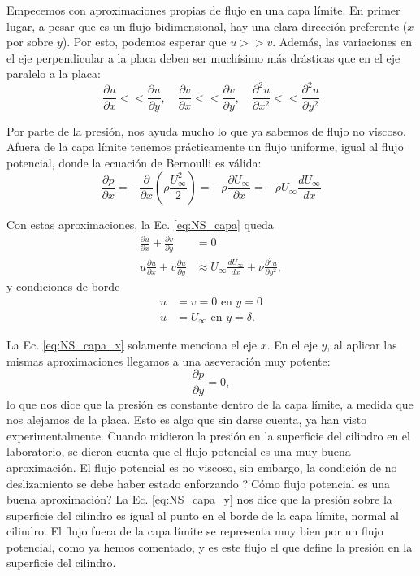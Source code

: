 Empecemos con aproximaciones propias de flujo en una capa límite.
En primer lugar, a pesar que es un flujo bidimensional, hay una clara dirección preferente ($x$ por sobre $y$).
Por esto, podemos esperar que $u>>v$.
Además, las variaciones en el eje perpendicular a la placa deben ser muchísimo más drásticas que en el eje paralelo a la placa:
%
\begin{equation}
\frac{\partial u}{\partial x} << \frac{\partial u}{\partial y}, \quad \frac{\partial v}{\partial x} << \frac{\partial v}{\partial y}, \quad \frac{\partial^2 u}{\partial x^2} << \frac{\partial^2 u}{\partial y^2}
\end{equation}

Por parte de la presión, nos ayuda mucho lo que ya sabemos de flujo no viscoso. 
Afuera de la capa límite tenemos prácticamente un flujo uniforme, igual al flujo potencial, donde la ecuación de Bernoulli es válida:
%
\begin{equation}
\frac{\partial p}{\partial x} = -\frac{\partial}{\partial x}\left(\rho \frac{U_\infty^2}{2}\right) = - \rho\frac{\partial U_\infty}{\partial x} = -\rho U_\infty\frac{dU_\infty}{dx} 
\end{equation}

Con estas aproximaciones, la Ec. \eqref{eq:NS_capa} queda
%
\begin{align}\label{eq:NS_capa_x}
\frac{\partial u}{\partial x} + \frac{\partial v}{\partial y} &= 0 \nonumber\\
u\frac{\partial u}{\partial x} + v\frac{\partial u}{\partial y} &\approx U_\infty \frac{dU_\infty}{dx} + \nu \frac{\partial^2u}{\partial y^2},
\end{align}
%
y condiciones de borde
%
\begin{align}
u &= v = 0 \text{ en } y=0\nonumber\\
u &= U_\infty \text{ en } y=\delta.
\end{align}

La Ec. \eqref{eq:NS_capa_x} solamente menciona el eje $x$.
En el eje $y$, al aplicar las mismas aproximaciones llegamos a una aseveración muy potente:
%
\begin{equation}\label{eq:NS_capa_y}
\frac{\partial p}{\partial y} = 0,
\end{equation}
%
lo que nos dice que la presión es constante dentro de la capa límite, a medida que nos alejamos de la placa.
Esto es algo que sin darse cuenta, ya han visto experimentalmente.
Cuando midieron la presión en la superficie del cilindro en el laboratorio, se dieron cuenta que el flujo potencial es una muy buena aproximación.
El flujo potencial es no viscoso, sin embargo, la condición de no deslizamiento se debe haber estado enforzando \mbox{?`}Cómo flujo potencial es una buena aproximación?
La Ec. \eqref{eq:NS_capa_y} nos dice que la presión sobre la superficie del cilindro es igual al punto en el borde de la capa límite, normal al cilindro. 
El flujo fuera de la capa límite se representa muy bien por un flujo potencial, como ya hemos comentado, y es este flujo el que define la presión en la superficie del cilindro.
